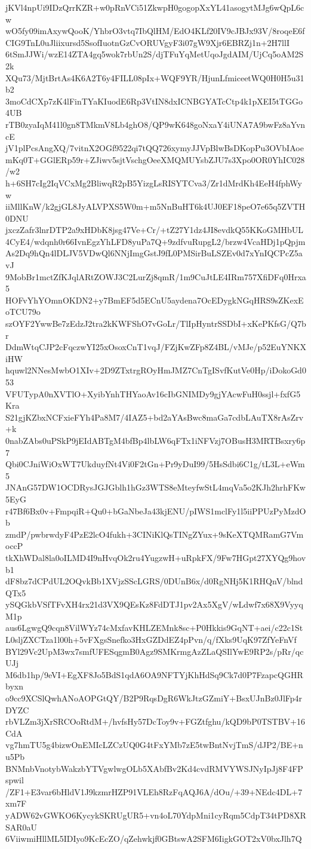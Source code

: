 jKVl4npUi9IDzQrrKZR+w0pRnVCi51ZkwpH0gogopXxYL41asogytMJg6wQpL6cw
wO5fy09imAxywQooK/YhbrO3vtq7IbQlHM/EdO4KLf20IV9cJBJx93V/8roqeE6f
CIG9TnL0uJliixursd5SsofIuotnGzCvORUVgyF3i07gW9Xjr6EBRZj1n+2H7llI
6tSmJJWi/wzE14ZTA4gq5wok7rbUn2S/djTFuYqMetUqoJgdAIM/UjCq5oAM2S2k
XQu73/MjtBrtAs4K6A2T6y4FILL08pIx+WQF9YR/HjunLfmiceetWQ0H0H5u31b2
3moCdCXp7zK4lFinTYaKIuodE6Rp3VtIN8dxICNBGYATcCtp4k1pXEI5tTGGo4UB
rTB0zyaIqM41l0gn8TMkmV8Lb4ghO8/QP9wK648goNxaY4iUNA7A9bwFz8aYvncE
jV1plPcsAngXQ/7vitnX2OGf9522qi7tQQ726xymyJJVpBlwBsDKopPu3OVbIAoe
mKq0T+GGlERp59r+ZJiwv5sjtVschgOeeXMQMUYsbZJU7s3Xpo0OR0YhIC028/w2
h+6SH7cIg2IqVCxMg2BliwqR2pB5YizgLsRISYTCva3/Zr1dMrdKh4EeH4fphWyw
iiMllKnW/k2gjGL8JyALVPXS5W0m+m5NnBuHT6k4UJ0EF18peO7e65q5ZVTH0DNU
jxczZafr3lnrDTP2a9xHDbK8jsg47Ve+Cr/+tZ27Y1dz4JI8evdkQ55KKoGMHbUL
4CyE4/wdqnh0r66IvnEgzYhLFD8yuPa7Q+9zdfvuRupgL2/brzw4VcaHDj1pQpjm
As2Dq9hQn4lDLJV5VDwQl6NNjImgGstJ9fL0PMSirBuLSZEv0d7xYnIQCPcZ5avJ
9MobBr1mctZfKJqlARtZOWJ3C2LurZj8qmR/1m9CuJtLE4IRm757XfiDFq0Hrxa5
HOFvYhYOmnOKDN2+y7BmEF5d5ECnU5aydena7OcEDygkNGqHRS9sZKexEoTCU79o
szOYF2YwwBe7zEdzJ2tra2kKWFShO7vGoLr/TlIpHyntrSSDbI+xKePKfsG/Q7br
DdmWtqCJP2cFqczwYI25xOsoxCnT1vqJ/FZjKwZFp8Z4BL/vMJe/p52EuYNKXiHW
hquwl2NNesMwbO1XIv+2D9ZTxtrgROyHmJMZ7CnTgISvfKutVe0Hp/iDokoGd053
VFUTypA0nXVTlO+XyibYnhTHYaoAv16cIbGNIMDy9gjYAcwFuH0ssjl+fxfG5Kra
S21gjKZbxNCFxieFYh4Pa8M7/4IAZ5+bd2aYAsBwc8maGa7cdbLAuTX8rAsZrv+k
0nabZAbs0uPSkP9jEIdABTgM4bfBp4lbLW6qFTx1iNFVzj7OBusH3MRTBsxry6p7
Qbi0CJniWiOxWT7UkduyfNt4Vi0F2tGn+Pr9yDuI99/5HsSdbi6C1g/tL3L+eWm5
JNAnG57DW1OCDRysJGJGblh1hGz3WTS8eMteyfwStL4mqVa5o2KJh2hrhFKw5EyG
r47Bf6Bx0v+FmpqiR+Qu0+bGaNbeJa43kjENU/pIWS1mclFy1l5iiPPUzPyMzdOb
zmdP/pwbrwdyF4PzE2lcO4fukh+3CINiKlQsTINgZYux+9sKeXTQMRamG7VmoccP
tkXhWDal8la0oILMD4I9nHvqOk2ru4YugzwH+uRpkFX/9Fw7HGpt27XYQg9hovb1
dF8bz7dCPdUL2OQvkBb1XVjzSScLGRS/0DUnB6x/d0RgNHj5K1RHQnV/blndQTx5
ySQGkbVSfTFvXH4rx21d3VX9QEsKz8FdDTJ1pv2Ax5XgV/wLdwf7x68X9VyyqM1p
aus6LgwgQ9cqn8VilWYz74cMxfavKHLZEMnk8sc+P0Hkkis9GqNT+aei/c22c1St
L0sljZXCTza1l00h+5vFXgsSnefko3HxGZDdEZ4pPvn/q/fXks9UqK97ZfYeFnVf
BYl29Vc2UpM3wx7smfUFESqgmB0Agz9SMKrmgAzZLaQSIlYwE9RP2s/pRr/qcUJj
M6db1hp/9eVI+EgXF8Jo5BdS1qdA6OA9NFTYjKhHdSq9Ck7d0P7FzapcQGHRbyxn
o9cc9XCSlQwhANoAOPGtQY/B2P9RqsDgR6WkJtzGZmiY+BsxUJnBz0JlFp4rDYZC
rbVLZm3jXrSRCOoRtdM+/hvfsHy57DcToy9v+FGZtfghu/kQD9bP0TSTBV+16CdA
vg7hmTU5g4bizwOnEMIcLZCzUQ0G4tFxYMb7zE5twBntNvjTmS/dJP2/BE+nu5Pb
BNMnbVnotybWakzbYTVgwlwgOLb5XAbfBv2Kd4cvdRMVYWSJNyIpJj8F4FPspwil
/ZF1+E3var6bHldV1J9kzmrHZP91VLEh8RzFqAQJ6A/dOu/+39+NEdc4DL+7xm7F
yADW62vGWKO6KycykSKRUgUR5+vn4oL70YdpMni1cyRqm5CdpT34tPD8XRSAR0aU
6ViiwmiHllML5IDIyo9KcEcZO/qZehwkjf0GBtswA2SFM6IigkGOT2xV0bxJlh7Q
